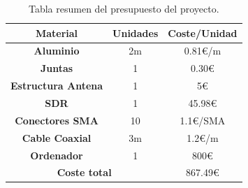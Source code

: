 \documentclass[a4paper,openright,12pt]{article}
\begin{document}
\begin{table}[h!]
\centering
\begin{tabular}{|c|c|c|} 
\hline
\textbf{Material}          & \textbf{Unidades} & \textbf{Coste/Unidad}            \\ 
\hline
\textbf{Aluminio}          & 2m                & 0.81\euro{}/m   \\ 
\hline
\textbf{Juntas}            & 1                 & 0.30\euro{}     \\ 
\hline
\textbf{Estructura Antena} & 1                 & 5\euro{}        \\ 
\hline
\textbf{SDR}               & 1                 & 45.98\euro{}    \\ 
\hline
\textbf{Conectores SMA}    & 10                & 1.1\euro{}/SMA  \\ 
\hline
\textbf{Cable Coaxial}     & 3m                & 1.2\euro{}/m    \\ 
\hline
\textbf{Ordenador}               & 1                 & 800\euro{}    \\ 
\hline
\multicolumn{2}{|c|}{\textbf{Coste total}}              & 867.49\euro{}    \\
\hline

\end{tabular}
\caption{Tabla resumen del presupuesto del proyecto.}
\label{Tab3:Presupuesto}
\end{table}
\end{document}
